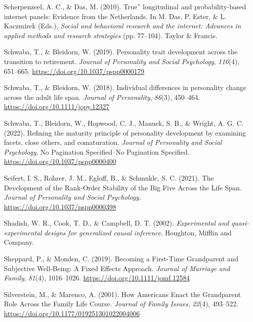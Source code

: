 \documentclass[
  english,
  man,floatsintext]{apa7}
\begin{document}
\leavevmode\hypertarget{ref-scherpenzeelTrueLongitudinalProbabilitybased2010}{}%
Scherpenzeel, A. C., \& Das, M. (2010). True'' longitudinal and probability-based internet panels: Evidence from the Netherlands. In M. Das, P. Ester, \& L. Kaczmirek (Eds.), \emph{Social and behavioral research and the internet: Advances in applied methods and research strategies} (pp. 77--104). Taylor \& Francis.

\leavevmode\hypertarget{ref-schwabaPersonalityTraitDevelopment2019}{}%
Schwaba, T., \& Bleidorn, W. (2019). Personality trait development across the transition to retirement. \emph{Journal of Personality and Social Psychology}, \emph{116}(4), 651--665. \url{https://doi.org/10.1037/pspp0000179}

\leavevmode\hypertarget{ref-schwabaIndividualDifferencesPersonality2018}{}%
Schwaba, T., \& Bleidorn, W. (2018). Individual differences in personality change across the adult life span. \emph{Journal of Personality}, \emph{86}(3), 450--464. \url{https://doi.org/10.1111/jopy.12327}

\leavevmode\hypertarget{ref-schwabaRefiningMaturityPrinciple2022}{}%
Schwaba, T., Bleidorn, W., Hopwood, C. J., Manuck, S. B., \& Wright, A. G. C. (2022). Refining the maturity principle of personality development by examining facets, close others, and comaturation. \emph{Journal of Personality and Social Psychology}, No Pagination Specified--No Pagination Specified. \url{https://doi.org/10.1037/pspp0000400}

\leavevmode\hypertarget{ref-seifertDevelopmentRankOrderStability2021}{}%
Seifert, I. S., Rohrer, J. M., Egloff, B., \& Schmukle, S. C. (2021). The Development of the Rank-Order Stability of the Big Five Across the Life Span. \emph{Journal of Personality and Social Psychology}. \url{https://doi.org/10.1037/pspp0000398}

\leavevmode\hypertarget{ref-shadishExperimentalQuasiexperimentalDesigns2002}{}%
Shadish, W. R., Cook, T. D., \& Campbell, D. T. (2002). \emph{Experimental and quasi-experimental designs for generalized causal inference}. Houghton, Mifflin and Company.

\leavevmode\hypertarget{ref-sheppardBecomingFirstTimeGrandparent2019}{}%
Sheppard, P., \& Monden, C. (2019). Becoming a First-Time Grandparent and Subjective Well-Being: A Fixed Effects Approach. \emph{Journal of Marriage and Family}, \emph{81}(4), 1016--1026. \url{https://doi.org/10.1111/jomf.12584}

\leavevmode\hypertarget{ref-silversteinHowAmericansEnact2001}{}%
Silverstein, M., \& Marenco, A. (2001). How Americans Enact the Grandparent Role Across the Family Life Course. \emph{Journal of Family Issues}, \emph{22}(4), 493--522. \url{https://doi.org/10.1177/019251301022004006}
\end{document}
